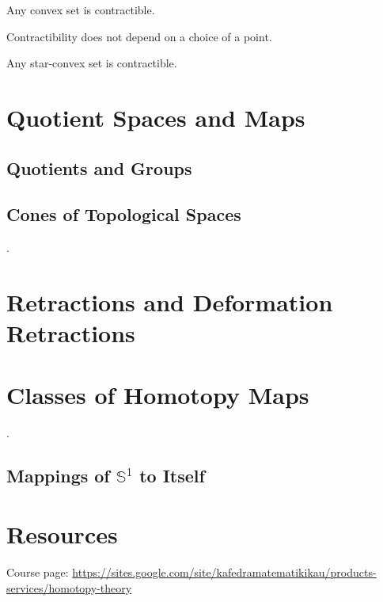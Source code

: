 \documentclass[10pt]{article}
\begin{document}



\begin{theorem}
  Any convex set is contractible.
\end{theorem}

\begin{elemma}
  Contractibility does not depend on a choice of a point.
\end{elemma}


\begin{theorem}
  Any star-convex set is contractible.
\end{theorem}

\section{Quotient Spaces and Maps}


\subsection{Quotients and Groups}

\subsection{Cones of Topological Spaces}

.

\section{Retractions and Deformation Retractions}

\section{Classes of Homotopy Maps}

.

\subsection{Mappings of $\mathbb{S}^1$ to Itself}


\section{Resources}

Course page: \url{https://sites.google.com/site/kafedramatematikikau/products-services/homotopy-theory}

{}

\end{document}
